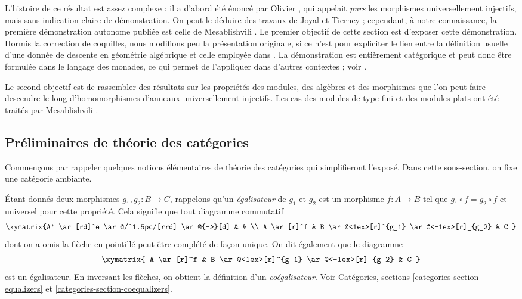 \medskip\noindent
L'histoire de ce résultat est assez complexe : il a d'abord été énoncé
par Olivier \cite{olivier}, qui appelait {\it purs} les morphismes
universellement injectifs, mais sans indication claire de démonstration.
On peut le déduire des travaux de Joyal et Tierney \cite{joyal-tierney} ;
cependant, à notre connaissance, la première démonstration autonome publiée
est celle de Mesablishvili \cite{mesablishvili1}.
Le premier objectif de cette section est d'exposer cette démonstration.
Hormis la correction de coquilles, nous modifions peu la présentation originale,
si ce n'est pour expliciter le lien entre la définition usuelle
d'une donnée de descente en géométrie algébrique et celle
employée dans \cite{mesablishvili1}.
La démonstration est entièrement catégorique et peut donc être formulée
dans le langage des monades, ce qui permet de l'appliquer
dans d'autres contextes ; voir \cite{janelidze-tholen}.

\medskip\noindent
Le second objectif est de rassembler des résultats sur les propriétés
des modules, des algèbres et des morphismes que l'on peut faire descendre le long
d'homomorphismes d'anneaux universellement injectifs.
Les cas des modules de type fini et des modules plats ont été traités
par Mesablishvili \cite{mesablishvili2}.


\subsection{Préliminaires de théorie des catégories}
\label{subsection-category-prelims}

\noindent
Commençons par rappeler quelques notions élémentaires de théorie des catégories
qui simplifieront l'exposé. Dans cette sous-section, on fixe une catégorie ambiante.

\medskip\noindent
Étant donnés deux morphismes $g_1, g_2: B \to C$, rappelons qu'un
{\it égalisateur} de $g_1$ et $g_2$ est un morphisme $f: A \to B$ tel que
$g_1 \circ f = g_2 \circ f$ et universel pour cette propriété.
Cela signifie que tout diagramme commutatif
$$
\xymatrix{A' \ar[rd]^e \ar@/^1.5pc/[rrd] \ar@{-->}[d] & & \\
A \ar[r]^f & B \ar@<1ex>[r]^{g_1} \ar@<-1ex>[r]_{g_2} & 
C
}
$$
dont on a omis la flèche en pointillé peut être complété de façon unique.
On dit également que le diagramme
\begin{equation}
\label{equation-equalizer}
\xymatrix{
A \ar[r]^f  & B \ar@<1ex>[r]^{g_1} \ar@<-1ex>[r]_{g_2} & C
}
\end{equation}
est un égalisateur. En inversant les flèches, on obtient la définition
d'un {\it coégalisateur}.
Voir Catégories, sections \ref{categories-section-equalizers} et
\ref{categories-section-coequalizers}.

